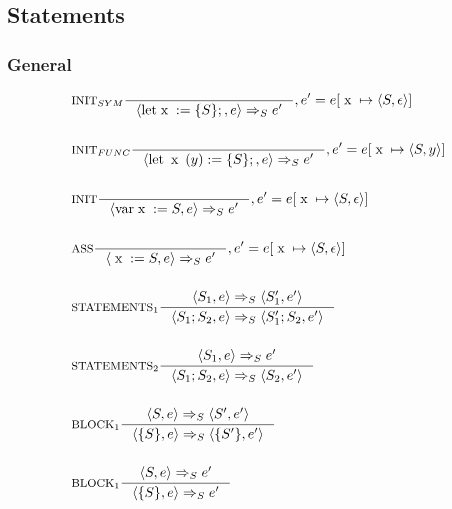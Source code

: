 \subsection{Statements}

\subsubsection{General}
\begin{align*}
&\inference[$\text{INIT}_{SYM}$]{}
                         {\Braket{\Tlet \Tx := \{S\};,e} \Rightarrow_S e'}
												 {, e' = e[\Tx \mapsto \Braket{S,\epsilon}]}
\\\\
&\inference[$\text{INIT}_{FUNC}$]{}
                         {\Braket{\Tlet \Tx(y) := \{S\};,e} \Rightarrow_S e'}
												 {, e' = e[\Tx \mapsto \Braket{S,y}]}
\\\\
&\inference[$\text{INIT}$]{}
                         {\Braket{\Tvar \Tx := S,e} \Rightarrow_S e'}
												 {, e' = e[\Tx \mapsto \Braket{S,\epsilon}]}
\\\\
&\inference[ASS]{}
                 {\Braket{\Tx := S,e} \Rightarrow_S e'}
								 {, e' = e[\Tx \mapsto \Braket{S,\epsilon}]}
\\\\
&\inference[$\text{STATEMENTS}_1$]{\Braket{S_1,e} \Rightarrow_S \Braket{S_1',e'}}
                         {\Braket{S_1;S_2,e} \Rightarrow_S \Braket{S_1';S_2,e'}}
\\\\
&\inference[$\text{STATEMENTS}_2$]{\Braket{S_1,e} \Rightarrow_S e'}
                         {\Braket{S_1;S_2,e} \Rightarrow_S \Braket{S_2,e'}}
\\\\
&\inference[$\text{BLOCK}_1$]{\Braket{S,e} \Rightarrow_S \Braket{S',e'}}
                         {\Braket{\{S\},e} \Rightarrow_S \Braket{\{S'\},e'}}
\\\\
&\inference[$\text{BLOCK}_1$]{\Braket{S,e} \Rightarrow_S e'}
                         {\Braket{\{S\},e} \Rightarrow_S e'}
\end{align*}


